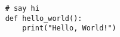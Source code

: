 \begin{lstlisting}
    # say hi
    def hello_world():
        print("Hello, World!")
\end{lstlisting}
